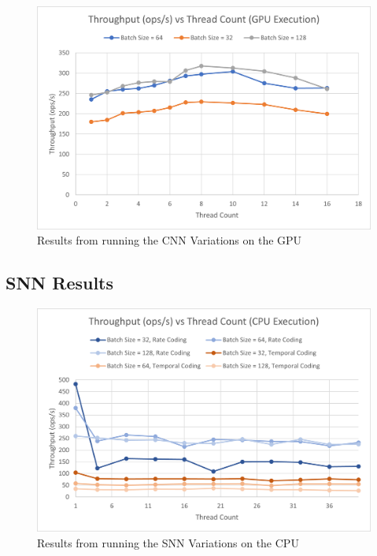 \documentclass[journal]{IEEEtran}
\begin{document}
\begin{figure}[!t]
\centering
\includegraphics[width=\linewidth]{CNN_GPU_Throughput.png}
\caption{Results from running the CNN Variations on the GPU}
\label{fig_sim}
\end{figure}



\subsection{SNN Results}


\begin{figure}[!t]
\centering
\includegraphics[width=\linewidth]{snn_results1.png}
\caption{Results from running the SNN Variations on the CPU}
\label{fig_sim}
\end{figure}
\end{document}
